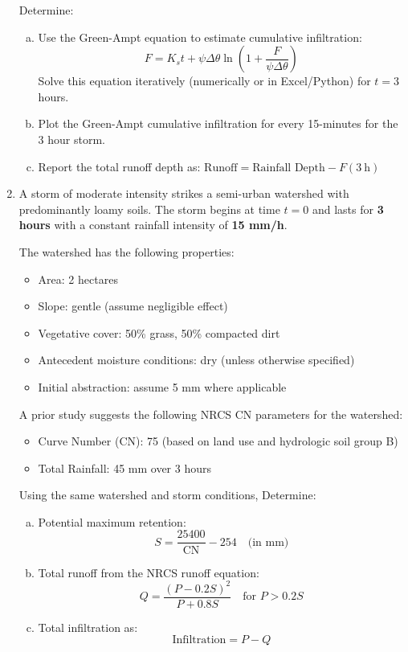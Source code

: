 \documentclass[12pt]{article}
\begin{document}
\begin{enumerate}
Determine:
\begin{enumerate}[a)]
     \item Use the Green-Ampt equation to estimate cumulative infiltration: 
     $$F = K_s t + \psi \Delta \theta \ln \left(1 + \frac{F}{\psi \Delta \theta} \right)$$ 
     Solve this equation iteratively (numerically or in Excel/Python) for $ t = 3 $ hours.
    \item Plot the Green-Ampt cumulative infiltration for every 15-minutes for the 3 hour storm.
    \item Report the total runoff depth as: $\text{Runoff} = \text{Rainfall Depth} - F(3\ \text{h})$
\end{enumerate}
\clearpage
\item A storm of moderate intensity strikes a semi-urban watershed with predominantly loamy soils. The storm begins at time $ t = 0 $ and lasts for \textbf{3 hours} with a constant rainfall intensity of \textbf{15 mm/h}.

The watershed has the following properties:

\begin{itemize}
    \item Area: 2 hectares
    \item Slope: gentle (assume negligible effect)
    \item Vegetative cover: 50\% grass, 50\% compacted dirt
    \item Antecedent moisture conditions: dry (unless otherwise specified)
    \item Initial abstraction: assume 5 mm where applicable
\end{itemize}

A prior study suggests the following NRCS CN parameters for the watershed:
\begin{itemize}
    \item Curve Number (CN): 75 (based on land use and hydrologic soil group B)
    \item Total Rainfall: 45 mm over 3 hours
\end{itemize}

Using the same watershed and storm conditions, Determine:
\begin{enumerate}[a)]
    \item Potential maximum retention:
    \[
    S = \frac{25400}{\text{CN}} - 254 \quad \text{(in mm)}
    \]
    \item Total runoff from the NRCS runoff equation:
    \[
    Q = \frac{(P - 0.2S)^2}{P + 0.8S} \quad \text{for } P > 0.2S
    \]
    \item Total infiltration as:
    \[
    \text{Infiltration} = P - Q
    \]
\end{enumerate}
\clearpage


\end{enumerate}
\end{document}
